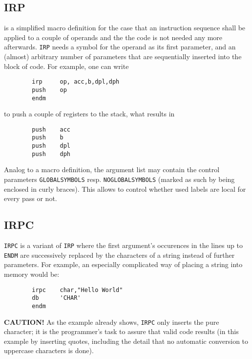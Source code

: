 \documentclass[12pt,twoside]{report}
\makeatletter
\newcommand{\bb}[1]{{\bf #1}}
\newcommand{\tty}[1]{{\tt #1}}
\newcommand{\ttindex}[1]{\index{#1@{\tt #1}}}
\makeatother
\begin{document}

\subsection{IRP}
\ttindex{IRP}

is a simplified macro definition for the case that an instruction sequence
shall be applied to a couple of operands and the the code is not needed
any more afterwards.  \tty{IRP} needs a symbol for the operand as its
first parameter, and an (almost) arbitrary number of parameters that are
sequentially inserted into the block of code.  For example, one can write
\begin{verbatim}
        irp     op, acc,b,dpl,dph
        push    op
        endm
\end{verbatim}
to push a couple of registers to the stack, what results in
\begin{verbatim}
        push    acc
        push    b
        push    dpl
        push    dph
\end{verbatim}
Analog to a macro definition, the argument list may contain the
control parameters \tty{GLOBALSYMBOLS} resp.
\tty{NOGLOBALSYMBOLS} (marked as such by being enclosed in curly
braces).  This allows to control whether used labels are local for
every pass or not.


\subsection{IRPC}
\ttindex{IRPC}

\tty{IRPC} is a variant of \tty{IRP} where the first argument's occurences
in the lines up to \tty{ENDM} are successively replaced by the characters
of a string instead of further parameters.  For example, an especially
complicated way of placing a string into memory would be:
\begin{verbatim}
        irpc    char,"Hello World"
        db      'CHAR'
        endm
\end{verbatim}
\bb{CAUTION!} As the example already shows, \tty{IRPC} only inserts the
pure character; it is the programmer's task to assure that valid code
results (in this example by inserting quotes, including the detail that no
automatic conversion to uppercase characters is done).

\end{document}

